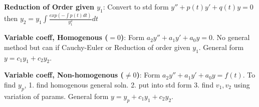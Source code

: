 \textbf{Reduction of Order given $y_1$}:
Convert to std form $y'' + p(t)y' + q(t)y = 0$ then $y_2 = y_1 \int \frac{exp(-\int p(t) dt)}{y_1^2} dt$

\textbf{Variable coeff, Homogenous ($=0$)}: 
Form $a_2y'' + a_1 y' + a_0 y = 0$. No general method but can if Cauchy-Euler or Reduction of order given $y_1$. General form $y = c_1 y_1 + c_2 y_2$.

\textbf{Variable coeff, Non-homogenous ($\neq 0$)}:
Form $a_2y'' + a_1 y' + a_0 y = f(t)$. To find $y_p$, 1. find homogenous general soln. 2. put into std form 3. find $v_1, v_2$ using variation of params. General form $y = y_p + c_1 y_1 + c_2 y_2$.

